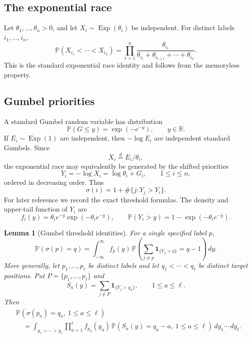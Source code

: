 \documentclass[11pt]{article}
\newtheorem{lemma}[theorem]{Lemma}
\theoremstyle{remark}
\newcommand{\Pp}{\mathbb P}
\newcommand{\Rr}{\mathbb R}
\newcommand{\one}{\mathbf 1}
\newcommand{\Exp}{\operatorname{Exp}}
\newcommand{\dd}{\,d}
\begin{document}
\subsection{The exponential race}
Let \(\theta_1,\ldots,\theta_n>0\), and let \(X_i\sim\Exp(\theta_i)\) be independent.  For distinct labels \(i_1,\ldots,i_n\),
\[
\Pp(X_{i_1}<\cdots<X_{i_n})
= \prod_{r=1}^n
 \frac{\theta_{i_r}}{\theta_{i_r}+\theta_{i_{r+1}}+\cdots+\theta_{i_n}}.
\]
This is the standard exponential race identity and follows from the memoryless property.


\subsection{Gumbel priorities}\label{subsec:gumbel-priorities}
A standard Gumbel random variable has distribution
\[
        \Pp(G\le y)=\exp(-e^{-y}),
        \qquad y\in\Rr .
\]
If \(E_i\sim\Exp(1)\) are independent, then \(-\log E_i\) are independent standard Gumbels.  Since
\[
        X_i\stackrel{d}=E_i/\theta_i,
\]
the exponential race may equivalently be generated by the shifted priorities
\[
        Y_i=-\log X_i=\log\theta_i+G_i,
        \qquad 1\le i\le n,
\]
ordered in decreasing order.  Thus
\[
        \sigma(i)=1+\#\{j:Y_j>Y_i\}.
\]
For later reference we record the exact threshold formulas.  The density and upper-tail function of \(Y_i\) are
\[
        f_i(y)=\theta_i e^{-y}\exp(-\theta_i e^{-y}),
        \qquad
        \Pp(Y_i>y)=1-\exp(-\theta_i e^{-y}).
\]

\begin{lemma}[Gumbel threshold identities]\label{lem:gumbel-threshold-identities}
For a single specified label \(p\),
\[
        \Pp(\sigma(p)=q)
        =\int_{-\infty}^{\infty}
        f_p(y)\,
        \Pp\left(\sum_{j\ne p}\one_{\{Y_j>y\}}=q-1\right)\dd y .
\]
More generally, let \(p_1,\ldots,p_\ell\) be distinct labels and let
\(q_1<\cdots<q_\ell\) be distinct target positions.  Put
\(P=\{p_1,\ldots,p_\ell\}\) and
\[
        S_a(y)=\sum_{j\notin P}\one_{\{Y_j>y_a\}},
        \qquad 1\le a\le\ell .
\]
Then
\[
\begin{aligned}
&\Pp(\sigma(p_a)=q_a,\ 1\le a\le\ell) \\
&\quad=\int_{y_1>\cdots>y_\ell}
        \prod_{a=1}^\ell f_{p_a}(y_a)\,
        \Pp(S_a(y)=q_a-a,\ 1\le a\le\ell)
        \dd y_1\cdots\dd y_\ell .
\end{aligned}
\]
\end{lemma}
\end{document}
